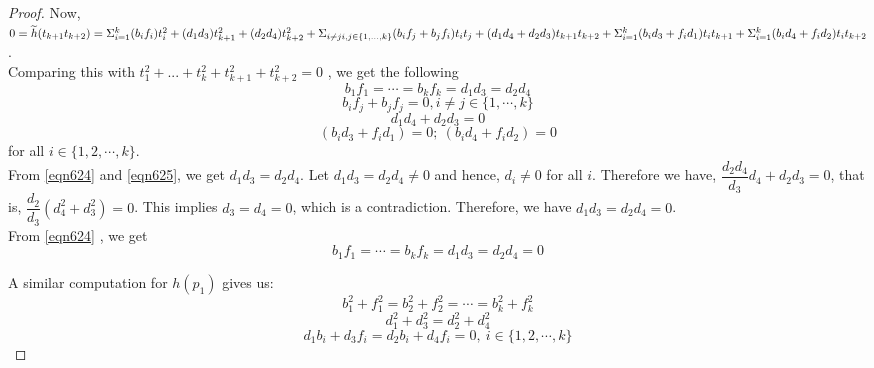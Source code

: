 \documentclass[a4paper,leqno,12pt]{amsart}
\theoremstyle{plain}
\theoremstyle{definition}
\theoremstyle{remark}
\begin{document}
{\begin{proof}
\noindent
Now,  $0= \widetilde{h}(t_{k+1}t_{k+2}) 
= \Sigma_{i=1}^{k} (b_{i}f_{i})t_{i}^{2}+ (d_{1}d_{3})t_{k+1}^{2}+(d_{2}d_{4})t_{k+2}^{2}+\Sigma_{i\neq j \\ i,j \in \{1,...,k\}}(b_{i}f_{j}+b_{j}f_{i}) t_{i}t_{j}+ (d_{1}d_{4}+d_{2}d_{3})t_{k+1}t_{k+2}+ \Sigma_{i=1}^{k}(b_{i}d_{3}+f_{i}d_{1})t_{i}t_{k+1}+\Sigma_{i=1}^{k}(b_{i}d_{4}+f_{i}d_{2})t_{i}t_{k+2}$. \\

\noindent
Comparing this with $t_{1}^{2}+...+t_{k}^{2}+t_{k+1}^{2}+t_{k+2}^{2}=0$ ,  we get the following
\begin{equation}
    b_{1}f_{1}= \cdots =b_{k}f_{k}=d_{1}d_{3}=d_{2}d_{4}
    \label{eqn624}
\end{equation}
\begin{equation}
    b_{i}f_{j}+b_{j}f_{j}=0 ,  i\neq j \in \{1,  \cdots ,k\}
    \nonumber
\end{equation}
\begin{equation}
    d_{1}d_{4}+d_{2}d_{3}=0 
    \label{eqn625}
\end{equation}
\begin{equation}
    (b_{i}d_{3}+f_{i}d_{1})=0 ; \ (b_{i}d_{4}+f_{i}d_{2})=0
    \nonumber
\end{equation}
 for all $ i \in \{1, 2,  \cdots,  k \}$.  \\
 
\noindent
From \ref{eqn624} and \ref{eqn625},  we get  $d_{1}d_{3}=d_{2}d_{4}$.  Let $d_{1}d_{3}=d_{2}d_{4}\neq 0$ and hence,   $d_{i}\neq 0$ for all $i$.  Therefore we have,  $\dfrac{d_{2}d_{4}}{d_{3}}d_{4}+d_{2}d_{3}=0$,  that is,   
    $\dfrac{d_{2}}{d_{3}}(d_{4}^{2}+d_{3}^{2})=0$. 
This implies $d_{3}=d_{4}=0$,  which is a contradiction.  Therefore,  we have $d_{1}d_{3}=d_{2}d_{4}=0$.\\

\noindent
From \ref{eqn624} , we get 
\begin{equation}
    b_{1}f_{1}= \cdots = b_{k}f_{k}=d_{1}d_{3}=d_{2}d_{4}=0
    \nonumber
\end{equation}


\noindent
 A similar computation for $h(p_{1})$ gives us: 
\begin{equation}
    b_{1}^{2}+ f_{1}^{2}=b_{2}^{2}+f_{2}^{2}= \cdots =b_{k}^{2}+f_{k}^{2}
    \nonumber
\end{equation}
\begin{equation}
    d_{1}^{2}+d_{3}^{2}=d_{2}^{2}+d_{4}^{2}
    \nonumber
\end{equation}
\begin{equation}
    d_{1}b_{i}+d_{3}f_{i}= d_{2}b_{i}+d_{4}f_{i}=0 , \ i \in \{ 1,2,  \cdots ,k\}
    \nonumber
\end{equation}    



\end{proof}}
\end{document}
